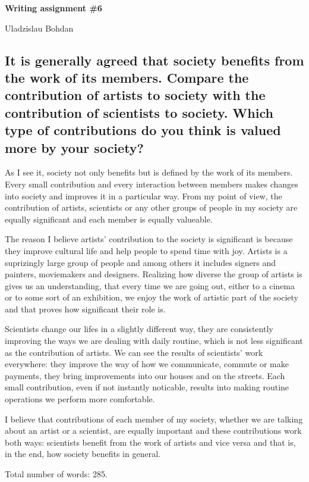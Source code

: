 \documentclass[12pt]{article}
\begin{document}
{\Large

\textbf{Writing assignment \#6}

Uladzislau Bohdan

}

\vspace{10mm}

\subsection*{It is generally agreed that society benefits from the work of its
members. Compare the contribution of artists to society with the contribution of
scientists to society. Which type of contributions do you think is valued more
by your society?}

As I see it, society not only benefits but is defined by the work of its members.
Every small contribution and every interaction between members makes changes
into society and improves it in a particular way. From my point of view,
the contribution of artists, scientists or any other groups of people in my society are equally
significant and each member is equally valueable.

The reason I believe artists' contribution to the society is significant is
because they improve cultural life and help people to spend time with joy.
Artists is a suprizingly large group of people and among others it includes signers and
painters, moviemakers and designers. Realizing how diverse the group of artists is gives us
an understanding, that every time we are going out, either to a cinema or
to some sort of an exhibition, we enjoy the work of artistic part of the society
and that proves how significant their role is.

Scientists change our lifes in a slightly different way, they are consistently
improving the ways we are dealing with daily routine, which is not less significant
as the contribution of artists. We can see the results of scientists' work everywhere:
they improve the way of how we communicate, commute or make payments, they bring
improvements into our houses and on the streets. Each small contribution, even if not
instantly noticable, results into making routine operations we perform more comfortable.

I believe that contributions of each member of my society, whether we are talking
about an artist or a scientist, are equally important and these contributions work
both ways: scientists benefit from the work of artists and vice versa and that
is, in the end, how society benefits in general.

\vspace{15mm}

Total number of words: 285.
\end{document}
